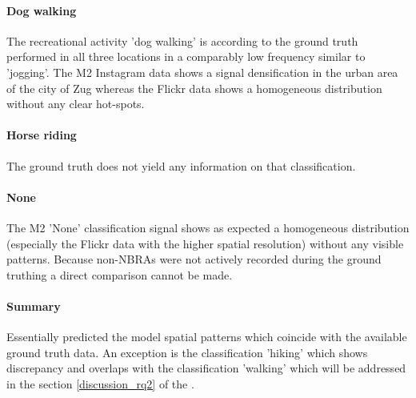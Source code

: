 \paragraph*{Dog walking}
The recreational activity 'dog walking' is according to the ground truth performed in all three locations in a comparably low frequency similar to 'jogging'. The M2 Instagram data shows a signal densification in the urban area of the city of Zug whereas the Flickr data shows a homogeneous distribution without any clear hot-spots.

\paragraph*{Horse riding}
The ground truth does not yield any information on that classification.

\paragraph*{None} The M2 'None' classification signal shows as expected a homogeneous distribution (especially the Flickr data with the higher spatial resolution) without any visible patterns. Because non-NBRAs were not actively recorded during the ground truthing a direct comparison cannot be made.

\paragraph*{Summary}
Essentially predicted the model spatial patterns which coincide with the available ground truth data. An exception is the classification 'hiking' which shows discrepancy and overlaps with the classification 'walking' which will be addressed in the section \ref{discussion_rq2} of the .


